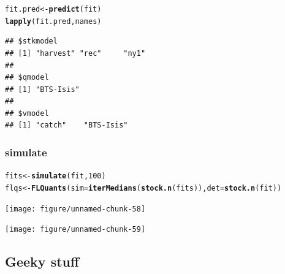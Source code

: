 \documentclass[a4paper,english,10pt]{article}\usepackage[]{graphicx}\usepackage[]{color}
\makeatletter
\newcommand{\hlnum}[1]{\textcolor[rgb]{0.686,0.059,0.569}{#1}}%
\newcommand{\hlstd}[1]{\textcolor[rgb]{0.345,0.345,0.345}{#1}}%
\newcommand{\hlkwb}[1]{\textcolor[rgb]{0.69,0.353,0.396}{#1}}%
\newcommand{\hlkwc}[1]{\textcolor[rgb]{0.333,0.667,0.333}{#1}}%
\newcommand{\hlkwd}[1]{\textcolor[rgb]{0.737,0.353,0.396}{\textbf{#1}}}%
\newenvironment{kframe}{%
 \def\at@end@of@kframe{}%
 \ifinner\ifhmode%
  \def\at@end@of@kframe{\end{minipage}}%
  \begin{minipage}{\columnwidth}%
 \fi\fi%
 \def\FrameCommand##1{\hskip\@totalleftmargin \hskip-\fboxsep
 \colorbox{shadecolor}{##1}\hskip-\fboxsep
     \hskip-\linewidth \hskip-\@totalleftmargin \hskip\columnwidth}%
 \MakeFramed {\advance\hsize-\width
   \@totalleftmargin\z@ \linewidth\hsize
   \@setminipage}}%
 {\par\unskip\endMakeFramed%
 \at@end@of@kframe}
\newenvironment{knitrout}{}{} %
\makeatother
\begin{document}
\begin{knitrout}
\color{fgcolor}\begin{kframe}
\begin{alltt}
\hlstd{fit.pred} \hlkwb{<-} \hlkwd{predict}\hlstd{(fit)}
\hlkwd{lapply}\hlstd{(fit.pred, names)}
\end{alltt}
\begin{verbatim}
## $stkmodel
## [1] "harvest" "rec"     "ny1"    
## 
## $qmodel
## [1] "BTS-Isis"
## 
## $vmodel
## [1] "catch"    "BTS-Isis"
\end{verbatim}
\end{kframe}
\end{knitrout}


\subsubsection{simulate}

\begin{knitrout}
\color{fgcolor}\begin{kframe}
\begin{alltt}
\hlstd{fits} \hlkwb{<-} \hlkwd{simulate}\hlstd{(fit,} \hlnum{100}\hlstd{)}
\hlstd{flqs} \hlkwb{<-} \hlkwd{FLQuants}\hlstd{(}\hlkwc{sim} \hlstd{=} \hlkwd{iterMedians}\hlstd{(}\hlkwd{stock.n}\hlstd{(fits)),} \hlkwc{det} \hlstd{=} \hlkwd{stock.n}\hlstd{(fit))}
\end{alltt}
\end{kframe}
\end{knitrout}


\begin{knitrout}
\color{fgcolor}

{\centering \texttt{[image: figure/unnamed-chunk-58]} 

}



\end{knitrout}


\begin{knitrout}
\color{fgcolor}

{\centering \texttt{[image: figure/unnamed-chunk-59]} 

}



\end{knitrout}


\subsection{Geeky stuff}
\end{document}
